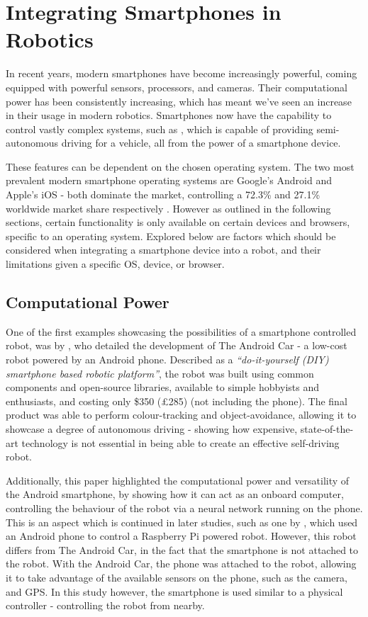 \documentclass{l4proj}
\begin{document}
\section{Integrating Smartphones in Robotics}\label{sec:smartphone-background}
In recent years, modern smartphones have become increasingly powerful, coming equipped with powerful sensors, processors, and cameras. Their computational power has been consistently increasing, which has meant we’ve seen an increase in their usage in modern robotics. Smartphones now have the capability to control vastly complex systems, such as \citet{comma}, which is capable of providing semi-autonomous driving for a vehicle, all from the power of a smartphone device. 

These features can be dependent on the chosen operating system. The two most prevalent modern smartphone operating systems are Google’s Android and Apple’s iOS - both dominate the market, controlling a 72.3\% and 27.1\% worldwide market share respectively \citep{osmarketshare}. However as outlined in the following sections, certain functionality is only available on certain devices and browsers, specific to an operating system. Explored below are factors which should be considered when integrating a smartphone device into a robot, and their limitations given a specific OS, device, or browser.

\subsection{Computational Power}
One of the first examples showcasing the possibilities of a smartphone controlled robot, was by \citet{oros2013smartphone}, who detailed the development of The Android Car - a low-cost robot powered by an Android phone. Described as a \textit{“do-it-yourself (DIY) smartphone based robotic platform”}, the robot was built using common components and open-source libraries, available to simple hobbyists and enthusiasts, and costing only \$350 (£285) (not including the phone). The final product was able to perform colour-tracking and object-avoidance, allowing it to showcase a degree of autonomous driving - showing how expensive, state-of-the-art technology is not essential in being able to create an effective self-driving robot.

Additionally, this paper highlighted the computational power and versatility of the Android smartphone, by showing how it can act as an onboard computer, controlling the behaviour of the robot via a neural network running on the phone. This is an aspect which is continued in later studies, such as one by \citet{7754547}, which used an Android phone to control a Raspberry Pi powered robot. However, this robot differs from The Android Car, in the fact that the smartphone is not attached to the robot. With the Android Car, the phone was attached to the robot, allowing it to take advantage of the available sensors on the phone, such as the camera, and GPS. In this study however, the smartphone is used similar to a physical controller - controlling the robot from nearby.
\end{document}
